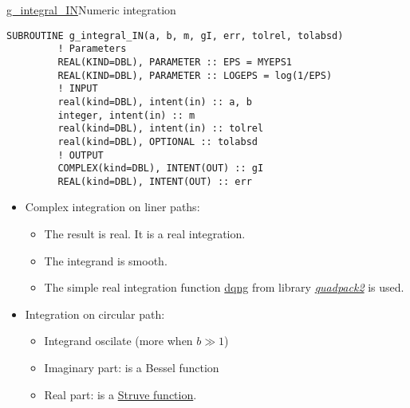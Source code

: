 \begin{frame}{\url{g_integral_IN}}{Numeric integration}

  \begin{lstlisting}[style=myFORTRANcodeS]
      SUBROUTINE g_integral_IN(a, b, m, gI, err, tolrel, tolabsd)
         ! Parameters
         REAL(KIND=DBL), PARAMETER :: EPS = MYEPS1
         REAL(KIND=DBL), PARAMETER :: LOGEPS = log(1/EPS)
         ! INPUT
         real(kind=DBL), intent(in) :: a, b
         integer, intent(in) :: m
         real(kind=DBL), intent(in) :: tolrel
         real(kind=DBL), OPTIONAL :: tolabsd
         ! OUTPUT
         COMPLEX(kind=DBL), INTENT(OUT) :: gI
         REAL(kind=DBL), INTENT(OUT) :: err
  \end{lstlisting}
  

  \begin{itemize}\small
    \item Complex integration on liner paths:
      \begin{itemize}\small
        \item The result is real. It is a real integration.
        \item The integrand is smooth.
        \item The simple real integration function \url{dqng} from library 
          \href{https://github.com/jacobwilliams/quadpack}{\emph{quadpack2}} is used.
      \end{itemize}
    \item Integration on circular path:
      \begin{itemize}\small
        \item Integrand oscilate (more when $b \gg 1$)
        \item Imaginary part: is a Bessel function
        \item Real part: is a \href{https://dlmf.nist.gov/11.2}{Struve function}.
      \end{itemize}
  \end{itemize}
  

\end{frame}


